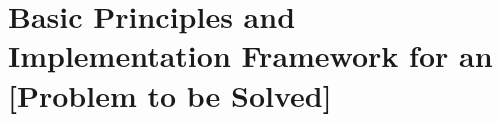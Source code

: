 \chapter{Basic Principles and Implementation Framework for an [Problem to be Solved]} \label{framework}

